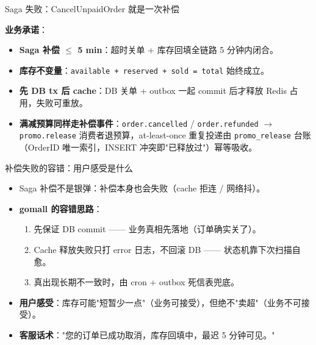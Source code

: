 \documentclass[aspectratio=169,11pt]{beamer}
\begin{document}
\begin{frame}[shrink]{Saga 失败：CancelUnpaidOrder 就是一次补偿}
\noindent{}\par
\vspace{2mm}
{\small \textbf{业务承诺}：
\begin{itemize}
  \item \textbf{Saga 补偿 $\leq$ 5 min}：超时关单 + 库存回填全链路 5 分钟内闭合。
  \item \textbf{库存不变量}：\texttt{available + reserved + sold = total} 始终成立。
  \item \textbf{先 DB tx 后 cache}：DB 关单 + outbox 一起 commit 后才释放 Redis 占用，失败可重放。
  \item \textbf{满减预算同样走补偿事件}：\texttt{order.cancelled} / \texttt{order.refunded} $\to$ \texttt{promo.release} 消费者退预算，at-least-once 重复投递由 \texttt{promo\_release} 台账（OrderID 唯一索引，INSERT 冲突即"已释放过"）幂等吸收。
\end{itemize}}
\end{frame}

\begin{frame}[shrink]{补偿失败的容错：用户感受是什么}
\begin{itemize}
  \item Saga 补偿不是银弹：补偿本身也会失败（cache 拒连 / 网络抖）。
  \item \textbf{gomall 的容错思路}：
  \begin{enumerate}
    \item 先保证 DB commit —— 业务真相先落地（订单确实关了）。
    \item Cache 释放失败只打 error 日志，不回滚 DB —— 状态机靠下次扫描自愈。
    \item 真出现长期不一致时，由 cron + outbox 死信表兜底。
  \end{enumerate}
  \item \textbf{用户感受}：库存可能"短暂少一点"（业务可接受），但绝不"卖超"（业务不可接受）。
  \item \textbf{客服话术}："您的订单已成功取消，库存回填中，最迟 5 分钟可见。"
\end{itemize}
\end{frame}
\end{document}

